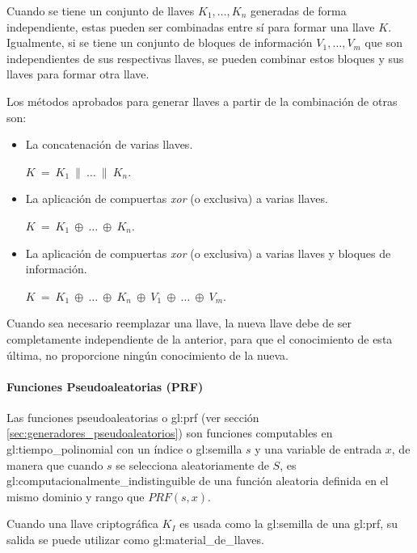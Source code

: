 Cuando se tiene un conjunto de llaves $K_1, \dots, K_n$ generadas de forma 
independiente, estas pueden ser combinadas entre sí para formar una llave $K$. 
Igualmente, si se tiene un conjunto de bloques de información $V_1, \dots, 
V_m$ que son independientes de sus respectivas llaves, se pueden combinar 
estos bloques y sus llaves para formar otra llave. 

Los métodos aprobados para generar llaves a partir de la combinación de 
otras son: 
\begin{itemize}

  \item La concatenación de varias llaves.

    $K\: =\: K_1\: \parallel\: \dots\: \parallel\: K_n$.

  \item La aplicación de compuertas \textit{xor} (o exclusiva) a varias llaves.

    $K\: =\: K_1\: \oplus\: \dots\: \oplus\: K_n$.
  
  \item La aplicación de compuertas \textit{xor} (o exclusiva) a varias llaves 
    y bloques de información.

    $K\: =\: K_1\: \oplus\: \dots\: \oplus\: K_n\: 
    \oplus\: V_1\: \oplus\: \dots\: \oplus\: V_m$.

\end{itemize}

Cuando sea necesario reemplazar una llave, la nueva llave debe de ser 
completamente independiente de la anterior, para que el conocimiento de esta 
última, no proporcione ningún conocimiento de la nueva.


\paragraph{Funciones Pseudoaleatorias (PRF)}

Las funciones pseudoaleatorias o \gls{gl:prf} (ver sección 
\ref{sec:generadores_pseudoaleatorios}) son funciones computables en 
\gls{gl:tiempo_polinomial} con un índice o \gls{gl:semilla} $s$ y una variable 
de entrada $x$, de manera que cuando $s$ se selecciona aleatoriamente de $S$, 
es \gls{gl:computacionalmente_indistinguible} de una función aleatoria 
definida en el mismo dominio y rango que $PRF(s,x)$.

Cuando una llave criptográfica $K_I$ es usada como la \gls{gl:semilla} de una 
\gls{gl:prf}, su salida se puede utilizar como \gls{gl:material_de_llaves}.


